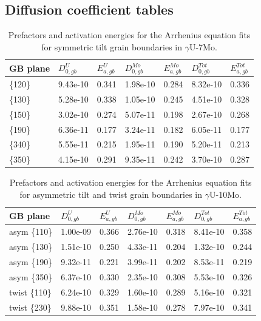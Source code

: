 \documentclass{elsarticle}
\begin{document}
\clearpage
\begin{appendices}

\setcounter{table}{0}
\renewcommand{\thetable}{A\arabic{table}}

\section{Diffusion coefficient tables}

\begin{table}[!ht]
\centering
\caption{Prefactors and activation energies for the Arrhenius equation fits for symmetric tilt grain boundaries in $\gamma$U-7Mo.}
\label{tab:u7mo}
\begin{tabular}{lllllll}
\toprule
GB plane & $D_{0,gb}^U$      & $E_{a,gb}^U$
	 & $D_{0,gb}^{Mo}$   & $E_{a,gb}^{Mo}$
	 & $D_{0,gb}^{Tot}$  & $E_{a,gb}^{Tot}$ \\
\midrule
\{120\}
	 & 9.43e-10 & 0.341
	 & 1.98e-10 & 0.284
	 & 8.32e-10 & 0.336 \\
\{130\}
	 & 5.28e-10 & 0.338
	 & 1.05e-10 & 0.245
	 & 4.51e-10 & 0.328 \\
\{150\}
	 & 3.02e-10 & 0.274
	 & 5.07e-11 & 0.198
	 & 2.67e-10 & 0.268 \\
\{190\}
	 & 6.36e-11 & 0.177
	 & 3.24e-11 & 0.182
	 & 6.05e-11 & 0.177 \\
\{340\}
	 & 5.55e-11 & 0.215
	 & 1.95e-11 & 0.190
	 & 5.20e-11 & 0.213 \\
\{350\}
	 & 4.15e-10 & 0.291
	 & 9.35e-11 & 0.242
	 & 3.70e-10 & 0.287 \\
\bottomrule
\end{tabular}
\end{table}

\begin{table}[!ht]
\centering
\caption{Prefactors and activation energies for the Arrhenius equation fits for asymmetric tilt and twist grain boundaries in $\gamma$U-10Mo.}
\label{tab:asym}
\begin{tabular}{lllllll}
\toprule
GB plane & $D_{0,gb}^U$      & $E_{a,gb}^U$
	 & $D_{0,gb}^{Mo}$   & $E_{a,gb}^{Mo}$
	 & $D_{0,gb}^{Tot}$  & $E_{a,gb}^{Tot}$ \\
\midrule
asym \{110\}
	& 1.00e-09 & 0.366
	& 2.76e-10 & 0.318
	& 8.41e-10 & 0.358 \\
asym \{130\}
	& 1.51e-10 & 0.250
	& 4.33e-11 & 0.204
	& 1.32e-10 & 0.244 \\
asym \{190\}
	& 9.32e-11 & 0.221
	& 3.99e-11 & 0.202
	& 8.53e-11 & 0.219 \\
asym \{350\}
	& 6.37e-10 & 0.330
	& 2.35e-10 & 0.308
	& 5.53e-10 & 0.326 \\
twist \{110\}
	& 6.24e-10 & 0.329
	& 1.60e-10 & 0.289
	& 5.16e-10 & 0.321 \\
twist \{230\}
	& 9.88e-10 & 0.351
	& 1.58e-10 & 0.278
	& 7.97e-10 & 0.341 \\
\bottomrule
\end{tabular}
\end{table}


\end{appendices}
\end{document}
